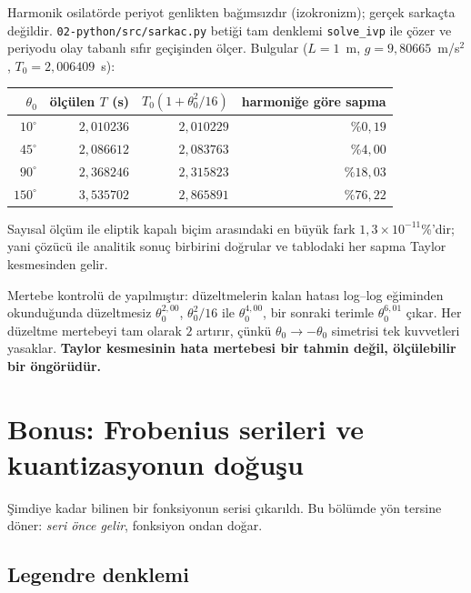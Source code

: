 \documentclass[11pt,a4paper]{article}
\theoremstyle{plain}
\theoremstyle{definition}
\theoremstyle{remark}
\begin{document}
Harmonik osilatörde periyot genlikten bağımsızdır (izokronizm); gerçek
sarkaçta değildir. \texttt{02-python/src/sarkac.py} betiği tam denklemi
\texttt{solve\_ivp} ile çözer ve periyodu olay tabanlı sıfır geçişinden ölçer.
Bulgular ($L = 1$~m, $g = 9{,}80665$~m/s$^2$, $T_0 = 2{,}006409$~s):

\begin{center}
\begin{tabular}{rrrr}
\hline
$\theta_0$ & ölçülen $T$ (s) & $T_0(1+\theta_0^2/16)$ & harmoniğe göre sapma \\
\hline
$10^\circ$  & $2{,}010236$ & $2{,}010229$ & \%$0{,}19$ \\
$45^\circ$  & $2{,}086612$ & $2{,}083763$ & \%$4{,}00$ \\
$90^\circ$  & $2{,}368246$ & $2{,}315823$ & \%$18{,}03$ \\
$150^\circ$ & $3{,}535702$ & $2{,}865891$ & \%$76{,}22$ \\
\hline
\end{tabular}
\end{center}

Sayısal ölçüm ile eliptik kapalı biçim arasındaki en büyük fark
$1{,}3\times 10^{-11}$\%'dir; yani çözücü ile analitik sonuç birbirini
doğrular ve tablodaki her sapma Taylor kesmesinden gelir.

Mertebe kontrolü de yapılmıştır: düzeltmelerin kalan hatası log--log eğiminden
okunduğunda düzeltmesiz $\theta_0^{2{,}00}$, $\theta_0^2/16$ ile
$\theta_0^{4{,}00}$, bir sonraki terimle $\theta_0^{6{,}01}$ çıkar. Her
düzeltme mertebeyi tam olarak $2$ artırır, çünkü $\theta_0 \to -\theta_0$
simetrisi tek kuvvetleri yasaklar. \textbf{Taylor kesmesinin hata mertebesi
bir tahmin değil, ölçülebilir bir öngörüdür.}

\section{Bonus: Frobenius serileri ve kuantizasyonun doğuşu}

Şimdiye kadar bilinen bir fonksiyonun serisi çıkarıldı. Bu bölümde yön
tersine döner: \emph{seri önce gelir}, fonksiyon ondan doğar.

\subsection*{Legendre denklemi}
\end{document}
